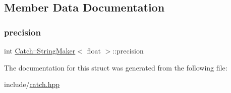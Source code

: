 \subsection{Member Data Documentation}
\mbox{\label{struct_catch_1_1_string_maker_3_01float_01_4_a54ebebe76a755dbe2dd8ad409c329378}} 
\subsubsection{\texorpdfstring{precision}{precision}}
{\footnotesize\ttfamily int \mbox{\hyperlink{struct_catch_1_1_string_maker}{Catch\+::\+String\+Maker}}$<$ float $>$\+::precision\hspace{0.3cm}{\ttfamily [static]}}



The documentation for this struct was generated from the following file\+:\begin{DoxyCompactItemize}
\item 
include/\mbox{\hyperlink{catch_8hpp}{catch.\+hpp}}\end{DoxyCompactItemize}
